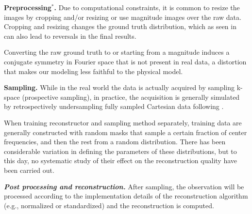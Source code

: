 \textbf{Preprocessing$^*$.} 
Due to computational constraints, it is common to resize the images by cropping and/or resizing or use magnitude images over the raw data. Cropping and resizing changes the ground truth distribution, which  as seen in  can also lead to reversals in the final results.


\begin{extremark}[Caveat \#1]
Converting the raw ground truth to or starting from a magnitude induces a conjugate symmetry in Fourier space that is not present in real data, a distortion that makes our modeling less faithful to the physical model.
\end{extremark}

\textbf{Sampling.} While in the real world the data is actually acquired by sampling k-space (prospective sampling), in practice, the acquisition is generally simulated by retrospectively undersampling fully sampled Cartesian data following .

When training reconstructor and sampling method separately, training data are generally constructed with random masks that sample a certain fraction of center frequencies, and then the rest from a random distribution.
There has been considerable variation in defining the parameters of these distributions, but to this day, no systematic study of their effect on the reconstruction quality have been carried out.

\textbf{\emph{Post processing and reconstruction.}}
After sampling, the observation will be processed according to the implementation details of the reconstruction algorithm (e.g., normalized or standardized) and the reconstruction is computed. 

